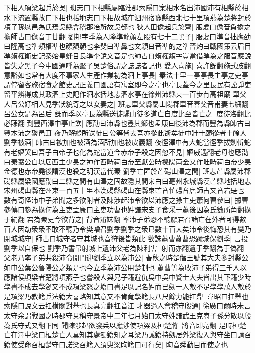 下相人項梁起兵於吳|{
	班志曰下相縣屬臨淮郡索隱曰案相水名出沛國沛有相縣於相水下流置縣故曰下相也括地志曰下相故城在泗州宿豫縣西北七十里項燕為楚將封於項子孫以邑為氏焉吳縣會稽郡冶所故吳都也}
狄人田儋起兵於齊|{
	服䖍曰儋音負擔之擔師古曰儋音丁甘翻}
劉邦字季為人隆準龍顔左股有七十二黑子|{
	服䖍曰準音拙應劭曰隆高也準頰權凖也顔額顙也李斐曰凖鼻也文穎曰音凖的之凖晉灼曰戰國策云眉目凖頞權衡史記秦始皇蜂目長凖李說文音是也師古曰頰權䪼字豈當借準為之服音應說皆失之黑子今中國通呼為黶子吳楚俗謂之誌誌者記也}
愛人喜施|{
	喜許旣翻施式豉翻}
意豁如也常有大度不事家人生產作業初為泗上亭長|{
	秦法十里一亭亭長主亭之吏亭謂停留客旅宿食之館史記正義曰國語有寓室即今之亭也亭長蓋今之里長民有訟諍吏留平辨得成其政泗上史記作泗水括地志泗水亭在徐州沛縣東一百步冇高祖廟}
單父人呂公好相人見季狀貌奇之以女妻之|{
	班志單父縣屬山陽郡單音善父音甫妻七細翻呂公女是為呂后}
旣而季以亭長為縣送徒驪山徒多道亡自度比至皆亡之|{
	度徒洛翻比必寐翻}
到豐西澤中亭止飲|{
	應劭曰沛縣也豐其鄉也孟康曰後沛為郡而豐為縣師古曰豐本沛之聚邑耳}
夜乃解縱所送徒曰公等皆去吾亦從此逝矣徒中壯士願從者十餘人劉季被酒|{
	師古曰被加也被酒為酒所加也被皮義翻}
夜徑澤中有大蛇當徑季拔劍斬蛇有老嫗哭曰吾子白帝子也化為蛇當道今赤帝子殺之因忽不見|{
	嫗威遇翻老母也應劭曰秦襄公自以居西主少昊之神作西畤祠白帝至獻公時櫟陽兩金又作畦畤祠白帝少昊金德也赤帝堯後謂漢也殺之明漢當代秦}
劉季亡匿於芒碭山澤之間|{
	班志芒縣屬沛郡碭縣屬梁國應劭曰二縣之間有山澤之固故隱其間宋白曰亳州永城縣漢芒縣地括地志宋州碭山縣在州東一百五十里本漢碭縣碭山在縣東芒音忙碭音唐師古又音宕是也}
數有奇怪沛中子弟聞之多欲附者及陳涉起沛令欲以沛應之掾主吏蕭何曹參曰|{
	據曹參傳曰參為掾何為主吏孟康曰主吏功曹也姓譜宋支子食采于蕭後因為氏數所角翻掾于絹翻}
君為秦吏今欲背之|{
	背音蒲妹翻}
率沛子弟恐不聽願君召諸亡在外者可得數百人因劫衆衆不敢不聽乃令樊噲召劉季劉季之衆已數十百人矣沛令後悔恐其有變乃閉城城守|{
	師古曰城守者守其城也音狩後皆類此}
欲誅蕭曹蕭曹恐踰城保劉季|{
	言投劉季以自保也}
劉季乃書帛射城上遺沛父老為陳利害|{
	射而亦翻遺于季翻為于偽翻}
父老乃率子弟共殺沛令開門迎劉季立以為沛公|{
	春秋之時楚僭王號其大夫多封縣公如申公葉公魯陽公之類是也今立季為沛公用楚制也}
蕭曹等為收沛子弟得三千人以應諸侯項梁者楚將項燕子也嘗殺人與兄子籍避仇吳中吳中賢士大夫皆出其下籍少時學書不成去學劒又不成項梁怒之籍曰書足以記名姓而已劒一人敵不足學學萬人敵於是項梁乃教籍兵法籍大喜略知其意又不肯竟學籍長八尺餘力能扛鼎|{
	韋昭曰扛舉也索隱曰說文云扛横關對舉也長真亮翻扛音江}
才器過人會稽守殷通|{
	徐廣曰爾時未言太守余謂戰國之時郡守只稱守景帝中二年七月始曰太守姓譜武王克商子孫分散以殷為氏守式又翻下同}
聞陳涉起欲發兵以應涉使項梁及桓楚將|{
	將音即亮翻}
是時桓楚亡在澤中梁曰桓楚亡人莫知其處獨籍知之耳梁乃誡籍持劔居外梁復入與守坐曰請召籍使受命召桓楚守曰諾梁召籍入須臾梁眴籍曰可行矣|{
	眴音舜動目而使之也}

